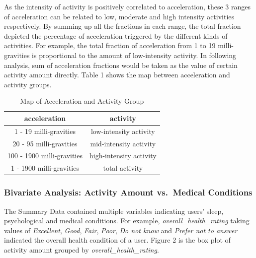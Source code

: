 \documentclass[12pt]{article}
\begin{document}
As the intensity of activity is positively correlated to acceleration,
these 3 ranges of acceleration can be related to low, moderate and high
intensity activities respectively. By summing up all the fractions in
each range, the total fraction depicted the percentage of acceleration
triggered by the different kinds of activities. For example, the total
fraction of acceleration from 1 to 19 milli-gravities is proportional to
the amount of low-intensity activity. In following analysis, sum of
acceleration fractions would be taken as the value of certain activity
amount directly. Table 1 shows the map between acceleration and activity
groups.

\begin{table}

\caption{\label{tab:unnamed-chunk-5}Map of Acceleration and Activity Group}
\centering
\begin{tabular}[t]{cc}
\toprule
acceleration & activity\\
\midrule
1 - 19 milli-gravities & low-intensity activity\\
20 - 95 milli-gravities & mid-intensity activity\\
100 - 1900 milli-gravities & high-intensity activity\\
1 - 1900 milli-gravities & total activity\\
\bottomrule
\end{tabular}
\end{table}

\hypertarget{bivariate-analysis-activity-amount-vs.-medical-conditions}{%
\subsubsection{Bivariate Analysis: Activity Amount vs.~Medical
Conditions}\label{bivariate-analysis-activity-amount-vs.-medical-conditions}}

The Summary Data contained multiple variables indicating users' sleep,
psychological and medical conditions. For example,
\emph{overall\_health\_rating} taking values of \emph{Excellent},
\emph{Good}, \emph{Fair}, \emph{Poor}, \emph{Do not know} and
\emph{Prefer not to answer} indicated the overall health condition of a
user. Figure 2 is the box plot of activity amount grouped by
\emph{overall\_health\_rating}.
\end{document}
